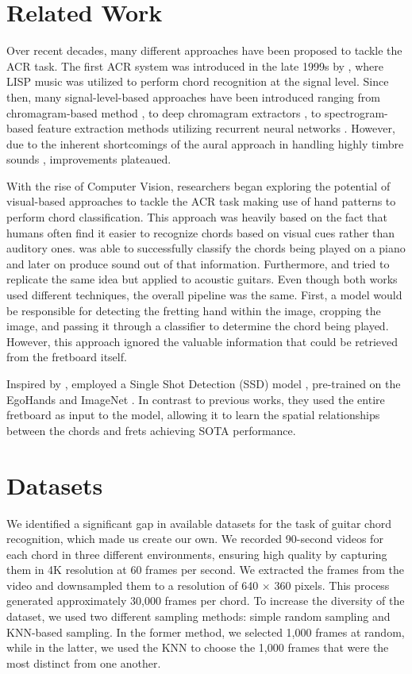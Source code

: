 \documentclass[10pt,twocolumn,letterpaper]{article}
\begin{document}
\section{Related Work}
Over recent decades, many different approaches have been proposed to tackle the ACR task. The first ACR system was introduced in the late 1999s by \cite{takuya1999realtime}, where LISP music was utilized to perform chord recognition at the signal level. Since then, many signal-level-based approaches have been introduced ranging from chromagram-based method \cite{stark2009real}, to deep chromagram extractors \cite{korzeniowski2016feature}, to spectrogram-based feature extraction methods utilizing recurrent neural networks \cite{boulanger2013audio}. However, due to the inherent shortcomings of the aural approach in handling highly timbre sounds \cite{du2023conditional}, improvements plateaued.

With the rise of Computer Vision, researchers began exploring the potential of visual-based approaches to tackle the ACR task making use of hand patterns to perform chord classification. This approach was heavily based on the fact that humans often find it easier to recognize chords based on visual cues rather than auditory ones. \cite{su2020audeo} was able to successfully classify the chords being played on a piano and later on produce sound out of that information. Furthermore, \cite{tran2019cnn} and \cite{ooaku2018guitar} tried to replicate the same idea but applied to acoustic guitars. Even though both works used different techniques, the overall pipeline was the same. First, a model would be responsible for detecting the fretting hand within the image, cropping the image, and passing it through a classifier to determine the chord being played. However, this approach ignored the valuable information that could be retrieved from the fretboard itself.

Inspired by \cite{tran2019cnn, ooaku2018guitar}, \cite{Kristian_Zaman_Tenoyo_Jodhinata_2024} employed a Single Shot Detection (SSD) model \cite{sandler2018mobilenetv2}, pre-trained on the EgoHands \cite{Bambach_2015_ICCV} and ImageNet \cite{deng2009imagenet}. In contrast to previous works, they used the entire fretboard as input to the model, allowing it to learn the spatial relationships between the chords and frets achieving SOTA performance.

\section{Datasets}
We identified a significant gap in available datasets for the task of guitar chord recognition, which made us create our own. We recorded 90-second videos for each chord in three different environments, ensuring high quality by capturing them in 4K resolution at 60 frames per second. We extracted the frames from the video and downsampled them to a resolution of 640 $\times$ 360 pixels. This process generated approximately 30,000 frames per chord. To increase the diversity of the dataset, we used two different sampling methods: simple random sampling and KNN-based sampling. In the former method, we selected 1,000 frames at random, while in the latter, we used the KNN to choose the 1,000 frames that were the most distinct from one another.
\end{document}
